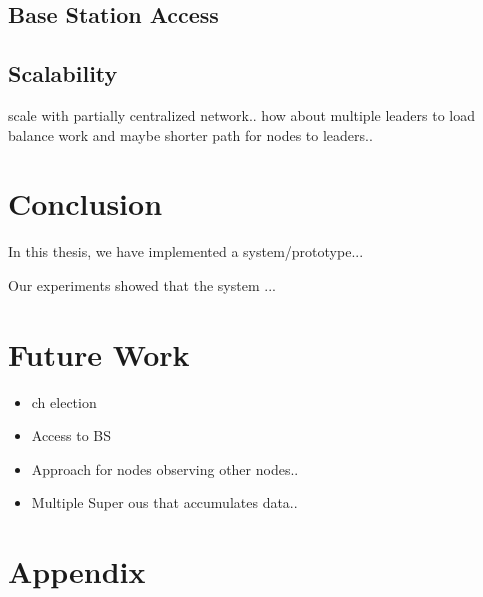 \documentclass[USenglish]{uit-thesis}
\begin{document}


\section{Base Station Access}

\section{Scalability}
scale with partially centralized network.. how about multiple leaders to load balance work and maybe shorter path for nodes to leaders..


\chapter{Conclusion}
In this thesis, we have implemented a system/prototype...

Our experiments showed that the system ...


\chapter{Future Work}

\begin{itemize}
\item \gls{ch} election
\item Access to BS
\item Approach for nodes observing other nodes..
\item Multiple Super \gls{ou}s that accumulates data..
\end{itemize}

\chapter{Appendix}

\backmatter


\newpage{}
\end{document}

